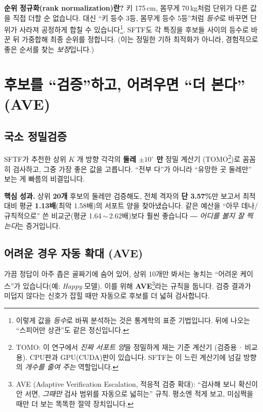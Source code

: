 \documentclass[11pt,a4paper]{article}
\begin{document}
\begin{notebox}
\textbf{순위 정규화(rank normalization)란?} 키 175\,cm, 몸무게 70\,kg처럼 단위가
다른 값을 직접 더할 순 없습니다. 대신 ``키 등수 3등, 몸무게 등수 5등''처럼
\emph{등수}로 바꾸면 단위가 사라져 공정하게 합칠 수 있습니다\footnote{이렇게 값을
\emph{등수}로 바꿔 분석하는 것은 통계학의 표준 기법입니다. 뒤에 나오는 ``스피어만
상관''도 같은 정신입니다.}. SFTF도 각 특징을 후보들 사이의 등수로 바꾼 뒤 가중합해
최종 순위를 정합니다. (이는 정밀한 기하 최적화가 아니라, 경험적으로 좋은 순서를
찾는 \emph{보정}입니다.)
\end{notebox}

\section{후보를 ``검증''하고, 어려우면 ``더 본다'' (AVE)}

\subsection{국소 정밀검증}

SFTF가 추천한 상위 $K$ 개 방향 각각의 \textbf{둘레 $\pm10^\circ$ 만} 정밀 계산기
(TOMO\footnote{TOMO: 이 연구에서 \emph{진짜 서포트 양}을 정밀하게 재는 기준 계산기
(검증용\,·\,비교용). CPU판과 GPU(CUDA)판이 있습니다. SFTF는 이 느린 계산기에 넘길
방향의 \emph{개수를 줄여 주는} 역할입니다.})로 꼼꼼히 검사하고, 그중 가장 좋은 값을
고릅니다. ``전부 다''가 아니라 ``유망한 곳 둘레만'' 보는 게 빠름의 비결입니다.

\begin{readbox}
\textbf{핵심 성과.} 상위 \textbf{20개} 후보의 둘레만 검증해도, 전체 격자의
\textbf{단 3.57\%}만 보고서 최적 대비 평균 \textbf{1.13배}(최악 1.58배)의 서포트
양을 찾아냈습니다. 같은 예산을 ``아무 데나/규칙적으로'' 쓴 비교군(평균 1.64\,$\sim$\,2.62배)보다
훨씬 좋습니다 ― \emph{어디를 볼지 잘 찍는다}는 증거입니다.
\end{readbox}

\subsection{어려운 경우 자동 확대 (AVE)}

가끔 정답이 아주 좁은 골짜기에 숨어 있어, 상위 10개만 봐서는 놓치는 ``어려운
케이스''가 있습니다(예: \emph{Happy} 모델). 이를 위해 \textbf{AVE}\footnote{AVE
(Adaptive Verification Escalation, 적응적 검증 확대): ``검사해 보니 확신이 안 서면,
\emph{그때만} 검사 범위를 자동으로 넓히는'' 규칙. 평소엔 적게 보고, 미심쩍을 때만 더
보는 똑똑한 절약 장치입니다.}라는 규칙을 둡니다. 검증 결과가 미덥지 않다는 신호가
잡힐 때만 자동으로 후보를 더 넓혀 검사합니다.
\end{document}
